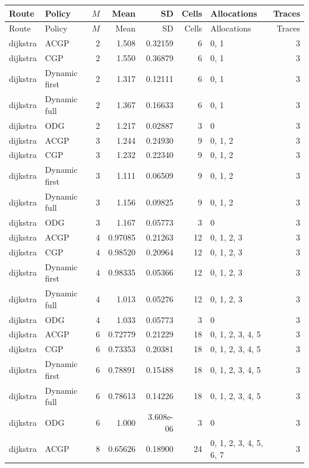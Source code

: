 \documentclass[10pt,a4paper]{article}
\begin{document}
\tiny\setlength{\tabcolsep}{2pt}\begin{longtable}{@{}p{23mm}p{29mm}rrrrp{36mm}r@{}}
\toprule Route & Policy & $M$ & Mean & SD & Cells & Allocations & Traces \\ \midrule\endfirsthead
\toprule Route & Policy & $M$ & Mean & SD & Cells & Allocations & Traces \\ \midrule\endhead
\bottomrule\endfoot
dijkstra & ACGP & 2 & 1.508 & 0.32159 & 6 & 0, 1 & 3 \\
dijkstra & CGP & 2 & 1.550 & 0.36879 & 6 & 0, 1 & 3 \\
dijkstra & Dynamic first & 2 & 1.317 & 0.12111 & 6 & 0, 1 & 3 \\
dijkstra & Dynamic full & 2 & 1.367 & 0.16633 & 6 & 0, 1 & 3 \\
dijkstra & ODG & 2 & 1.217 & 0.02887 & 3 & 0 & 3 \\
dijkstra & ACGP & 3 & 1.244 & 0.24930 & 9 & 0, 1, 2 & 3 \\
dijkstra & CGP & 3 & 1.232 & 0.22340 & 9 & 0, 1, 2 & 3 \\
dijkstra & Dynamic first & 3 & 1.111 & 0.06509 & 9 & 0, 1, 2 & 3 \\
dijkstra & Dynamic full & 3 & 1.156 & 0.09825 & 9 & 0, 1, 2 & 3 \\
dijkstra & ODG & 3 & 1.167 & 0.05773 & 3 & 0 & 3 \\
dijkstra & ACGP & 4 & 0.97085 & 0.21263 & 12 & 0, 1, 2, 3 & 3 \\
dijkstra & CGP & 4 & 0.98520 & 0.20964 & 12 & 0, 1, 2, 3 & 3 \\
dijkstra & Dynamic first & 4 & 0.98335 & 0.05366 & 12 & 0, 1, 2, 3 & 3 \\
dijkstra & Dynamic full & 4 & 1.013 & 0.05276 & 12 & 0, 1, 2, 3 & 3 \\
dijkstra & ODG & 4 & 1.033 & 0.05773 & 3 & 0 & 3 \\
dijkstra & ACGP & 6 & 0.72779 & 0.21229 & 18 & 0, 1, 2, 3, 4, 5 & 3 \\
dijkstra & CGP & 6 & 0.73353 & 0.20381 & 18 & 0, 1, 2, 3, 4, 5 & 3 \\
dijkstra & Dynamic first & 6 & 0.78891 & 0.15488 & 18 & 0, 1, 2, 3, 4, 5 & 3 \\
dijkstra & Dynamic full & 6 & 0.78613 & 0.14226 & 18 & 0, 1, 2, 3, 4, 5 & 3 \\
dijkstra & ODG & 6 & 1.000 & 3.608e-06 & 3 & 0 & 3 \\
dijkstra & ACGP & 8 & 0.65626 & 0.18900 & 24 & 0, 1, 2, 3, 4, 5, 6, 7 & 3 \\

\end{longtable}
\end{document}
